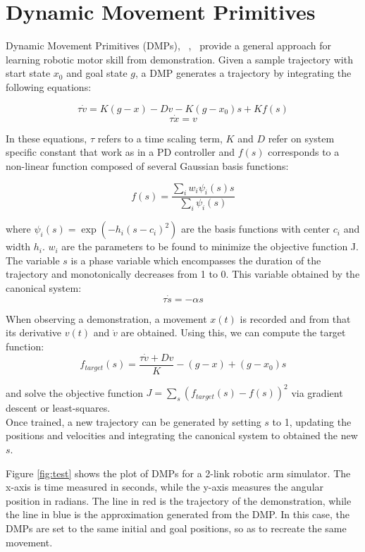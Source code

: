 \documentclass[a4paper]{article}
\begin{document}
\section{Dynamic Movement Primitives}

\indent \indent Dynamic Movement Primitives (DMPs), ~\cite{Pastor:2009:LGM:1703435.1703645},~\cite{Schaal_TISAMAM_2003} provide a general approach for learning robotic motor skill from demonstration. Given a sample trajectory with start state $x_0$ and goal state $g$, a DMP generates a trajectory by integrating the following equations:

$$
\tau \dot{v} = K(g - x) - Dv - K(g - x_0) s + Kf(s)
$$
$$
\tau \dot{x} = v
$$

In these equations, $\tau$ refers to a time scaling term, $K$ and $D$ refer on system specific constant that work as in a PD controller and $f(s)$ corresponds to a non-linear function composed of several Gaussian basis functions:

$$
f(s) = \frac{\sum_i w_i \psi_i(s) s }{\sum_i \psi_i(s)}
$$

where $\psi_i(s) = \exp(-h_i(s-c_i)^2)$ are the basis functions with center $c_i$ and width $h_i$. $w_i$ are the parameters to be found to minimize the objective function J. \\
\indent The variable $s$ is a phase variable which encompasses the duration of the trajectory and monotonically decreases from 1 to 0. This variable obtained by the canonical system:
$$
\tau \dot{s} = -\alpha s
$$
 
When observing a demonstration, a movement $x(t)$ is recorded and from that its derivative $v(t)$ and $\dot{v}$ are obtained. Using this, we can compute the target function:
$$
f_{target}(s) = \frac{\tau \dot{v} + Dv}{K} - (g - x) + (g - x_0) s
$$ 

and solve the objective function $J = \sum_s (f_{target}(s) - f(s))^2$ via gradient descent or least-squares. \\
\indent Once trained, a new trajectory can be generated by setting $s$ to 1, updating the positions and velocities and integrating the canonical system to obtained the new $s$.

Figure \ref{fig:test} shows the plot of DMPs for a 2-link robotic arm simulator. The x-axis is time measured in seconds, while the y-axis measures the angular position in radians. The line in red is the trajectory of the demonstration, while the line in blue is the approximation generated from the DMP. In this case, the DMPs are set to the same initial and goal positions, so as to recreate the same movement.  
 
\end{document}
